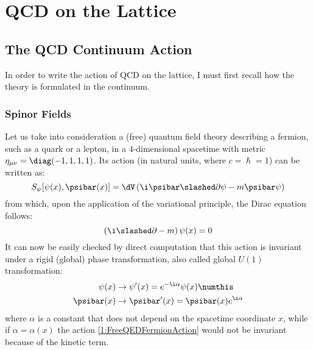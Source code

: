 \pagestyle{myFancy}
\chapter{QCD on the Lattice}
\section{The QCD Continuum Action}
In order to write the action of QCD on the lattice, I must first recall how the theory is formulated in the continuum.

\subsection{Spinor Fields}
Let us take into consideration a (free) quantum field theory describing a fermion, such as a quark or a lepton, in a $4$-dimensional spacetime with metric $\eta_{\mu\nu} = \diag(-1,1,1,1)$. Its action (in natural units, where $c = \hslash = 1$) can be written as:
\begin{equation}
      S_\psi[\psi(x),\psibar(x)] = \dV \left( \i\psibar\slashed\partial\psi - m\psibar\psi \right) \label{1:FreeQEDFermionAction}
\end{equation}
from which, upon the application of the variational principle, the Dirac equation follows:
\begin{equation}
    \left( \i\slashed\partial-m \right) \psi(x) = 0 \label{1:DiracEq}
\end{equation}
It can now be easily checked by direct computation that this action is invariant under a rigid (global) phase transformation, also called global $U(1)$ transformation:
\begin{align*}
    \psi(x) &\rightarrow \psi'(x) = e^{-\i\alpha}\psi(x) \numthis\label{1:PhaseTransform} \\
    \psibar(x) &\rightarrow \psibar'(x) = \psibar(x) e^{\i\alpha}
\end{align*}
where $\alpha$ is a constant that does not depend on the spacetime coordinate $x$, while if $\alpha=\alpha(x)$ the action \eqref{1:FreeQEDFermionAction} would not be invariant because of the kinetic term.

